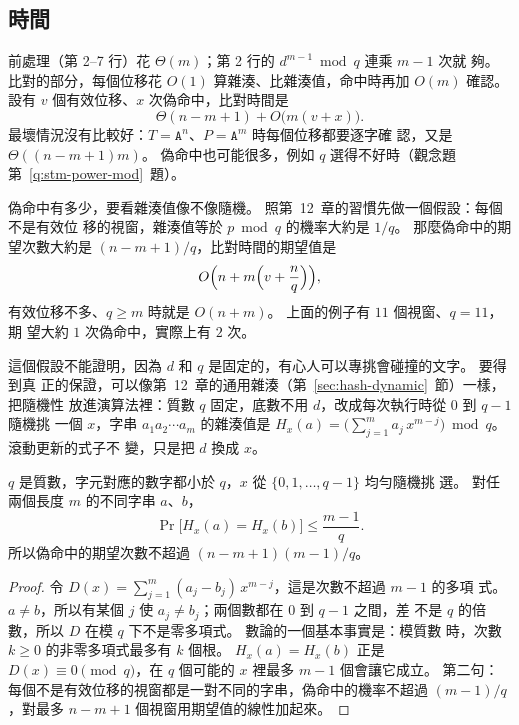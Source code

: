 \subsection{時間}

前處理（第 2--7 行）花 $\Theta(m)$；第 2 行的 $d^{m-1} \bmod q$ 連乘 $m - 1$ 次就
夠。 比對的部分，每個位移花 $O(1)$ 算雜湊、比雜湊值，命中時再加 $O(m)$ 確認。 設有
$v$ 個有效位移、$x$ 次偽命中，比對時間是
\[
\Theta(n - m + 1) + O\bigl(m (v + x)\bigr).
\]
最壞情況沒有比較好：$T = \mathtt{A}^n$、$P = \mathtt{A}^m$ 時每個位移都要逐字確
認，又是 $\Theta((n - m + 1)m)$。 偽命中也可能很多，例如 $q$ 選得不好時（觀念題
第~\ref{q:stm-power-mod}~題）。

偽命中有多少，要看雜湊值像不像隨機。 照第~12~章的習慣先做一個假設：每個不是有效位
移的視窗，雜湊值等於 $p \bmod q$ 的機率大約是 $1/q$。 那麼偽命中的期望次數大約是
$(n - m + 1)/q$，比對時間的期望值是
\[
O\Bigl(n + m \Bigl(v + \frac{n}{q}\Bigr)\Bigr),
\]
有效位移不多、$q \ge m$ 時就是 $O(n + m)$。 上面的例子有 $11$ 個視窗、$q = 11$，期
望大約 $1$ 次偽命中，實際上有 $2$ 次。

這個假設不能證明，因為 $d$ 和 $q$ 是固定的，有心人可以專挑會碰撞的文字。 要得到真
正的保證，可以像第~12~章的通用雜湊（第~\ref{sec:hash-dynamic}~節）一樣，把隨機性
放進演算法裡：質數 $q$ 固定，底數不用 $d$，改成每次執行時從 $0$ 到 $q - 1$ 隨機挑
一個 $x$，字串 $a_1 a_2 \cdots a_m$ 的雜湊值是
$H_x(a) = \bigl( \sum_{j=1}^{m} a_j \, x^{m-j} \bigr) \bmod q$。 滾動更新的式子不
變，只是把 $d$ 換成 $x$。

\begin{theorem}
\label{thm:stm-rk-random}
$q$ 是質數，字元對應的數字都小於 $q$，$x$ 從 $\{0, 1, \ldots, q - 1\}$ 均勻隨機挑
選。 對任兩個長度 $m$ 的不同字串 $a$、$b$，
\[
\Pr\bigl[ H_x(a) = H_x(b) \bigr] \le \frac{m - 1}{q}.
\]
所以偽命中的期望次數不超過 $(n - m + 1)(m - 1)/q$。
\end{theorem}

\begin{proof}
令 $D(x) = \sum_{j=1}^{m} (a_j - b_j) \, x^{m-j}$，這是次數不超過 $m - 1$ 的多項
式。 $a \ne b$，所以有某個 $j$ 使 $a_j \ne b_j$；兩個數都在 $0$ 到 $q - 1$ 之間，差
不是 $q$ 的倍數，所以 $D$ 在模 $q$ 下不是零多項式。 數論的一個基本事實是：模質數
時，次數 $k \ge 0$ 的非零多項式最多有 $k$ 個根。 $H_x(a) = H_x(b)$ 正是
$D(x) \equiv 0 \pmod q$，在 $q$ 個可能的 $x$ 裡最多 $m - 1$ 個會讓它成立。 第二句：
每個不是有效位移的視窗都是一對不同的字串，偽命中的機率不超過 $(m - 1)/q$，對最多
$n - m + 1$ 個視窗用期望值的線性加起來。
\end{proof}

